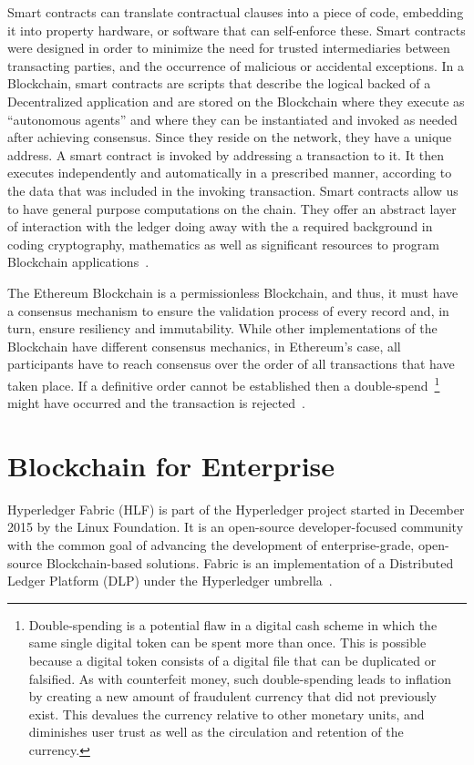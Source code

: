 Smart contracts can translate contractual clauses into a piece of code,
embedding it into property hardware, or software that can self-enforce these.
Smart contracts were designed in order to minimize the need for trusted
intermediaries between transacting parties, and the occurrence of malicious or
accidental exceptions. In a Blockchain, smart contracts are scripts that
describe the logical backed of a Decentralized application and are stored on
the Blockchain where they execute as “autonomous agents” and where they can be
instantiated and invoked as needed after achieving consensus.  Since they
reside on the network, they have a unique address. A smart contract is invoked
by addressing a transaction to it.  It then executes independently and
automatically in a prescribed manner, according to the data that was included
in the invoking transaction. Smart contracts allow us to have general purpose
computations on the chain.  They offer an abstract layer of interaction with
the ledger doing away with the a required background in coding cryptography,
mathematics as well as significant resources to program Blockchain
applications~\cite{Wood2017,BlockGeeks2017}.

The Ethereum Blockchain is a permissionless Blockchain, and thus, it must have
a consensus mechanism to ensure the validation process of every record and, in
turn, ensure resiliency and immutability. While other implementations of the
Blockchain have different consensus mechanics, in Ethereum’s case, all
participants have to reach consensus over the order of all transactions that
have taken place. If a definitive order cannot be established then a
double-spend~\footnote{Double-spending is a potential flaw in a digital cash
scheme in which the same single digital token can be spent more than once.
This is possible because a digital token consists of a digital file that can be
duplicated or falsified. As with counterfeit money, such double-spending leads
to inflation by creating a new amount of fraudulent currency that did not
previously exist. This devalues the currency relative to other monetary units,
and diminishes user trust as well as the circulation and retention of the
currency.} might have occurred and the transaction is rejected~\cite{Wood2017}.

\section{Blockchain for Enterprise} \label{enterpriseBlockchain}

Hyperledger Fabric (HLF) is part of the Hyperledger project started in December
2015 by the Linux Foundation. It is an open-source developer-focused community
with the common goal of advancing the development of enterprise-grade,
open-source Blockchain-based solutions.  Fabric is an implementation of a
Distributed Ledger Platform (DLP) under the Hyperledger
umbrella~\cite{Cachin2016}.

